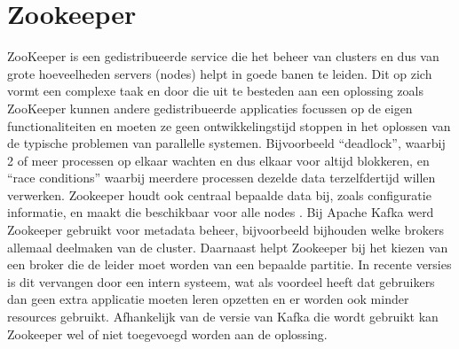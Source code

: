 \section{Zookeeper}
ZooKeeper is een gedistribueerde service die het beheer van clusters en dus van grote hoeveelheden servers (nodes) helpt in goede banen te leiden. Dit op zich vormt een complexe taak en door die uit te besteden aan een oplossing zoals ZooKeeper kunnen andere gedistribueerde applicaties focussen op de eigen functionaliteiten en moeten ze geen ontwikkelingstijd stoppen in het oplossen van de typische problemen van parallelle systemen. Bijvoorbeeld ``deadlock'', waarbij 2 of meer processen op elkaar wachten en dus elkaar voor altijd blokkeren, en ``race conditions'' waarbij meerdere processen dezelde data terzelfdertijd willen verwerken. 
Zookeeper houdt ook centraal bepaalde data bij, zoals configuratie informatie, en maakt die beschikbaar voor alle nodes \autocite{ASF2023}.
\newline
\newline 
Bij Apache Kafka werd Zookeeper gebruikt voor metadata beheer, bijvoorbeeld bijhouden welke brokers allemaal deelmaken van de cluster. Daarnaast helpt Zookeeper bij het kiezen van een broker die de leider moet worden van een bepaalde partitie. In recente versies is dit vervangen door een intern systeem, wat als voordeel heeft dat gebruikers dan geen extra applicatie moeten leren opzetten en er worden ook minder resources gebruikt.
\autocite{Conduktor2023}
\newline
\newline
Afhankelijk van de versie van Kafka die wordt gebruikt kan Zookeeper wel of niet toegevoegd worden aan de oplossing.
\newline
\newline

